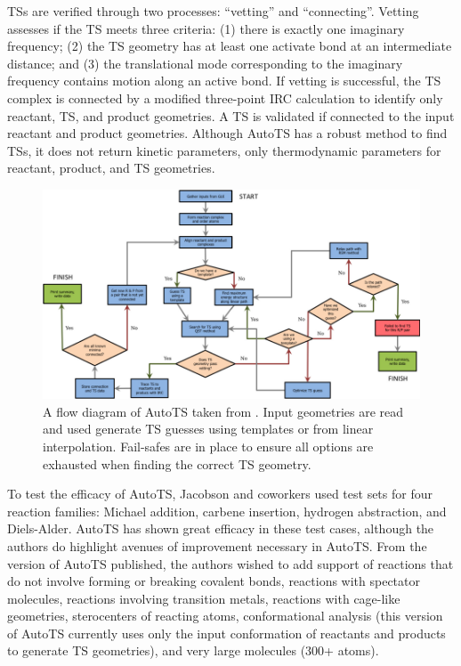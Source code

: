 \documentclass[preprint, 11pt]{elsarticle} %
\begin{document}
TSs are verified through two processes: ``vetting'' and ``connecting''. 
Vetting assesses if the TS meets three criteria: (1) there is exactly one imaginary frequency; (2) the TS geometry has at least one activate bond at an intermediate distance; and (3) the translational mode corresponding to the imaginary frequency contains motion along an active bond.
If vetting is successful, the TS complex is connected by a modified three-point IRC calculation to identify only reactant, TS, and product geometries. 
A TS is validated if connected to the input reactant and product geometries.
Although AutoTS has a robust method to find TSs, it does not return kinetic parameters, only thermodynamic parameters for reactant, product, and TS geometries.

\begin{figure}[h!]
\centering
\includegraphics[width=\textwidth]{autots_workflow}
\caption{A flow diagram of AutoTS taken from \cite{jacobson:2017}. Input geometries are read and used generate TS guesses using templates or from linear interpolation. Fail-safes are in place to ensure all options are exhausted when finding the correct TS geometry.}
\label{fig:autots_workflow}
\end{figure}

To test the efficacy of AutoTS, Jacobson and coworkers used test sets for four reaction families: Michael addition, carbene insertion, hydrogen abstraction, and Diels-Alder.
AutoTS has shown great efficacy in these test cases, although the authors do highlight avenues of improvement necessary in AutoTS.
From the version of AutoTS published, the authors wished to add support of reactions that do not involve forming or breaking covalent bonds, reactions with spectator molecules, reactions involving transition metals, reactions with cage-like geometries, sterocenters of reacting atoms, conformational analysis (this version of AutoTS currently uses only the input conformation of reactants and products to generate TS geometries), and very large molecules (300+ atoms).
\end{document}
